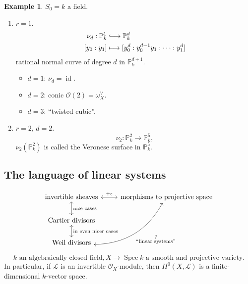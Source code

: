 \documentclass[12pt]{article}
\DeclareMathOperator{\id}{id}
\DeclareMathOperator{\Spec}{Spec}
\theoremstyle{definition}
\newtheorem*{example}{Example}
\begin{document}
\begin{example}
$S_0=k$ a field.

\begin{enumerate}[label=\arabic*)]
\item $r=1$.
\begin{align*}
\nu_d:\mathbb{P}_k^1&\lhook\joinrel\longrightarrow\mathbb{P}_k^d\\
[y_0:y_1]&\longmapsto[y_0^d:y_0^{d-1}y_1:\cdots:y_1^d]
\end{align*}
rational normal curve of degree $d$ in $\mathbb{P}_k^{d+1}$.

\begin{itemize}
\item $d=1$: $\nu_d=\id$.

\item $d=2$: conic $\mathcal{O}(2)=\omega_X^{\vee}$.

\item $d=3$: ``twisted cubic''.
\end{itemize}

\item $r=2$, $d=2$.
\[\nu_2:\mathbb{P}_k^2\longrightarrow\mathbb{P}_k^5,\]
$\nu_2(\mathbb{P}_k^2)$ is called the Veronese surface in $\mathbb{P}_k^5$.
\end{enumerate}
\end{example}

\subsection*{The language of linear systems}
\[
\begin{tikzcd}
\text{invertible sheaves}\arrow[r,<->,"+\epsilon"]\arrow[d,<->,"\text{nice cases}"]&\text{morphisms to projective space}\\
\text{Cartier divisors}\arrow[d,<->,"\text{in even nicer cases}"]\\
\text{Weil divisors}\arrow[ruu,<->,bend right,"\substack{\text{?}\\\text{``linear systems''}}",swap]
\end{tikzcd}
\]

\begin{equation}\tag{$**$}\label{condition_smooth_proj}
k\text{ an algebraically closed field},X\longrightarrow\Spec k\text{ a smooth and projective variety}.
\end{equation}
In particular, if $\mathcal{L}$ is an invertible $\mathcal{O}_X$-module, then $H^0(X,\mathcal{L})$ is a finite-dimensional $k$-vector space.
\end{document}
